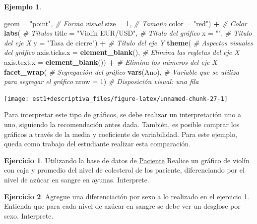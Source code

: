\documentclass[
  11pt,
]{book}
\newenvironment{Shaded}{\begin{snugshade}}{\end{snugshade}}
\newcommand{\AttributeTok}[1]{\textcolor[rgb]{0.13,0.29,0.53}{#1}}
\newcommand{\CommentTok}[1]{\textcolor[rgb]{0.56,0.35,0.01}{\textit{#1}}}
\newcommand{\DecValTok}[1]{\textcolor[rgb]{0.00,0.00,0.81}{#1}}
\newcommand{\FunctionTok}[1]{\textcolor[rgb]{0.13,0.29,0.53}{\textbf{#1}}}
\newcommand{\NormalTok}[1]{#1}
\newcommand{\SpecialCharTok}[1]{\textcolor[rgb]{0.81,0.36,0.00}{\textbf{#1}}}
\newcommand{\StringTok}[1]{\textcolor[rgb]{0.31,0.60,0.02}{#1}}
\theoremstyle{definition}
\theoremstyle{definition}
\newtheorem{example}{Ejemplo}[chapter]
\theoremstyle{definition}
\newtheorem{exercise}{Ejercicio}[chapter]
\theoremstyle{definition}
\theoremstyle{remark}
\begin{document}
\begin{example}
\begin{Shaded}
\begin{Highlighting}[]
    \AttributeTok{geom =} \StringTok{"point"}\NormalTok{, }\CommentTok{\# Forma visual}
    \AttributeTok{size =} \DecValTok{1}\NormalTok{, }\CommentTok{\# Tamaño}
    \AttributeTok{color =} \StringTok{"red"}\NormalTok{) }\SpecialCharTok{+} \CommentTok{\# Color}
  \FunctionTok{labs}\NormalTok{( }\CommentTok{\# Títulos}
    \AttributeTok{title =} \StringTok{"Violín EUR/USD"}\NormalTok{, }\CommentTok{\# Título del gráfico}
    \AttributeTok{x =} \StringTok{""}\NormalTok{, }\CommentTok{\# Título del eje X}
    \AttributeTok{y =} \StringTok{"Tasa de cierre"}\NormalTok{) }\SpecialCharTok{+} \CommentTok{\# Título del eje Y}
  \FunctionTok{theme}\NormalTok{( }\CommentTok{\# Aspectos visuales del gráfico}
    \AttributeTok{axis.ticks.x =} \FunctionTok{element\_blank}\NormalTok{(), }\CommentTok{\# Elimina las regletas del eje X}
    \AttributeTok{axis.text.x =} \FunctionTok{element\_blank}\NormalTok{()) }\SpecialCharTok{+} \CommentTok{\# Elimina los números del eje X}
  \FunctionTok{facet\_wrap}\NormalTok{( }\CommentTok{\# Segregación del gráfico}
    \FunctionTok{vars}\NormalTok{(Ano), }\CommentTok{\# Variable que se utiliza para segregar el gráfico}
    \AttributeTok{nrow =} \DecValTok{1}\NormalTok{) }\CommentTok{\# Disposición visual: una fila}
\end{Highlighting}
\end{Shaded}

\begin{center}\texttt{[image: est1+descriptiva\_files/figure-latex/unnamed-chunk-27-1]} \end{center}

Para interpretar este tipo de gráficos, se debe realizar un interpretación uno a uno, siguiendo la recomendación antes dada. También, es posible comprar los gráficos a través de la media y coeficiente de variabilidad. Para este ejemplo, queda como trabajo del estudiante realizar esta comparación.
\end{example}

\begin{exercise}
\protect\hypertarget{exr:violin-colesterol-azucar}{}\label{exr:violin-colesterol-azucar}Utilizando la base de datos de \hyperref[Pacientes]{Paciente} Realice un gráfico de violín con caja y promedio del nivel de colesterol de los paciente, diferenciando por el nivel de azúcar en sangre en ayunas. Interprete.
\end{exercise}

\begin{exercise}
Agregue una diferenciación por sexo a lo realizado en el ejercicio \ref{exr:violin-colesterol-azucar}. Entienda que para cada nivel de azúcar en sangre se debe ver un desglose por sexo. Interprete.
\end{exercise}
\end{document}
